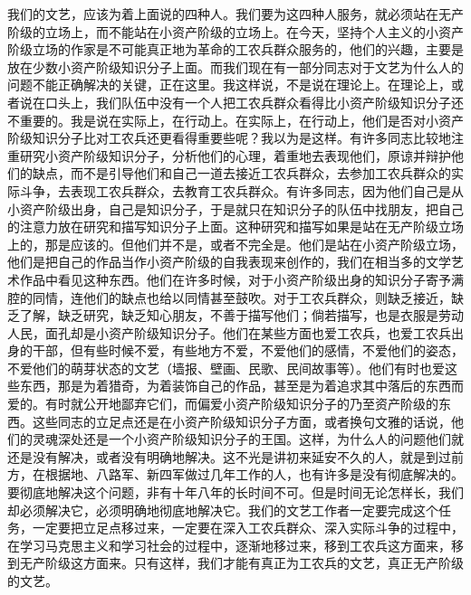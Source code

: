 我们的文艺，应该为着上面说的四种人。我们要为这四种人服务，就必须站在无产阶级的立场上，而不能站在小资产阶级的立场上。在今天，坚持个人主义的小资产阶级立场的作家是不可能真正地为革命的工农兵群众服务的，他们的兴趣，主要是放在少数小资产阶级知识分子上面。而我们现在有一部分同志对于文艺为什么人的问题不能正确解决的关键，正在这里。我这样说，不是说在理论上。在理论上，或者说在口头上，我们队伍中没有一个人把工农兵群众看得比小资产阶级知识分子还不重要的。我是说在实际上，在行动上。在实际上，在行动上，他们是否对小资产阶级知识分子比对工农兵还更看得重要些呢？我以为是这样。有许多同志比较地注重研究小资产阶级知识分子，分析他们的心理，着重地去表现他们，原谅并辩护他们的缺点，而不是引导他们和自己一道去接近工农兵群众，去参加工农兵群众的实际斗争，去表现工农兵群众，去教育工农兵群众。有许多同志，因为他们自己是从小资产阶级出身，自己是知识分子，于是就只在知识分子的队伍中找朋友，把自己的注意力放在研究和描写知识分子上面。这种研究和描写如果是站在无产阶级立场上的，那是应该的。但他们并不是，或者不完全是。他们是站在小资产阶级立场，他们是把自己的作品当作小资产阶级的自我表现来创作的，我们在相当多的文学艺术作品中看见这种东西。他们在许多时候，对于小资产阶级出身的知识分子寄予满腔的同情，连他们的缺点也给以同情甚至鼓吹。对于工农兵群众，则缺乏接近，缺乏了解，缺乏研究，缺乏知心朋友，不善于描写他们；倘若描写，也是衣服是劳动人民，面孔却是小资产阶级知识分子。他们在某些方面也爱工农兵，也爱工农兵出身的干部，但有些时候不爱，有些地方不爱，不爱他们的感情，不爱他们的姿态，不爱他们的萌芽状态的文艺（墙报、壁画、民歌、民间故事等）。他们有时也爱这些东西，那是为着猎奇，为着装饰自己的作品，甚至是为着追求其中落后的东西而爱的。有时就公开地鄙弃它们，而偏爱小资产阶级知识分子的乃至资产阶级的东西。这些同志的立足点还是在小资产阶级知识分子方面，或者换句文雅的话说，他们的灵魂深处还是一个小资产阶级知识分子的王国。这样，为什么人的问题他们就还是没有解决，或者没有明确地解决。这不光是讲初来延安不久的人，就是到过前方，在根据地、八路军、新四军做过几年工作的人，也有许多是没有彻底解决的。要彻底地解决这个问题，非有十年八年的长时间不可。但是时间无论怎样长，我们却必须解决它，必须明确地彻底地解决它。我们的文艺工作者一定要完成这个任务，一定要把立足点移过来，一定要在深入工农兵群众、深入实际斗争的过程中，在学习马克思主义和学习社会的过程中，逐渐地移过来，移到工农兵这方面来，移到无产阶级这方面来。只有这样，我们才能有真正为工农兵的文艺，真正无产阶级的文艺。

